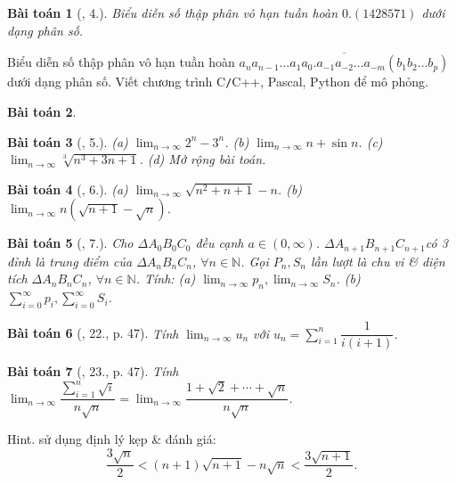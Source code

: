 \documentclass{article}
\newtheorem{baitoan}{Bài toán}
\begin{document}
\begin{baitoan}[\cite{TLCT_dai_so_giai_tich_11}, 4.]
	Biểu diễn số thập phân vô hạn tuần hoàn $0.(1428571)$ dưới dạng phân số.
\end{baitoan}
	Biểu diễn số thập phân vô hạn tuần hoàn $\overline{a_na_{n-1}\ldots a_1a_0.a_{-1}a_{-2}\ldots a_{-m}(b_1b_2\ldots b_p)}$ dưới dạng phân số. Viết chương trình {\sf C{\tt/}C++, Pascal, Python} để mô phỏng.
\begin{baitoan}
	
\end{baitoan}

\begin{baitoan}[\cite{TLCT_dai_so_giai_tich_11}, 5.]
	(a) $\lim_{n\to\infty} 2^n - 3^n$. (b) $\lim_{n\to\infty} n + \sin n$. (c) $\lim_{n\to\infty} \sqrt[3]{n^3 + 3n + 1}$. (d) Mở rộng bài toán.
\end{baitoan}

\begin{baitoan}[\cite{TLCT_dai_so_giai_tich_11}, 6.]
	(a) $\lim_{n\to\infty} \sqrt{n^2 + n + 1} - n$. (b) $\lim_{n\to\infty} n(\sqrt{n + 1} - \sqrt{n})$.
\end{baitoan}

\begin{baitoan}[\cite{TLCT_dai_so_giai_tich_11}, 7.]
	Cho $\Delta A_0B_0C_0$ đều cạnh $a\in(0,\infty)$. $\Delta A_{n+1}B_{n+1}C_{n+1}$có 3 đỉnh là trung điểm của $\Delta A_nB_nC_n$, $\forall n\in\mathbb{N}$. Gọi $P_n,S_n$ lần lượt là chu vi \& diện tích $\Delta A_nB_nC_n$, $\forall n\in\mathbb{N}$. Tính: (a) $\lim_{n\to\infty} p_n,\lim_{n\to\infty} S_n$. (b) $\sum_{i=0}^\infty p_i,\sum_{i=0}^\infty S_i$.
\end{baitoan}

\begin{baitoan}[\cite{TLCT_BT_dai_so_giai_tich_11}, 22., p. 47]
	Tính $\lim_{n\to\infty} u_n$ với $u_n = \sum_{i=1}^n \dfrac{1}{i(i + 1)}$.
\end{baitoan}

\begin{baitoan}[\cite{TLCT_BT_dai_so_giai_tich_11}, 23., p. 47]
	Tính $\lim_{n\to\infty} \dfrac{\sum_{i=1}^n \sqrt{i}}{n\sqrt{n}} = \lim_{n\to\infty} \dfrac{1 + \sqrt{2} + \cdots + \sqrt{n}}{n\sqrt{n}}$.
\end{baitoan}
{\sf Hint.} sử dụng định lý kẹp \& đánh giá:
\begin{equation*}
	\frac{3\sqrt{n}}{2} < (n + 1)\sqrt{n + 1} - n\sqrt{n} < \frac{3\sqrt{n + 1}}{2}.
\end{equation*}
\end{document}
